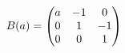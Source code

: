 \documentclass[preview]{standalone}
\begin{document}
\begin{align*}
\special{dvisvgm:raw <g id='unique000'>}B(a)=\begin{pmatrix}a&-1&0\\0&1&-1\\0&0&1\end{pmatrix}\special{dvisvgm:raw </g>}
\end{align*}
\end{document}
